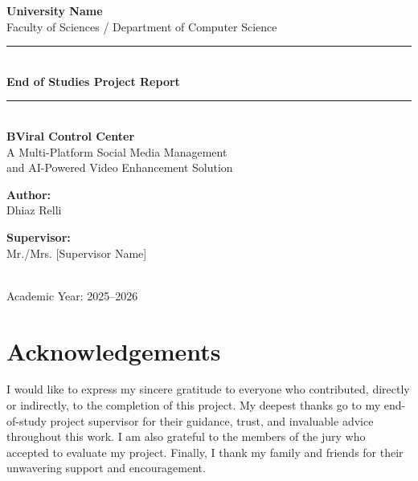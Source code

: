 \documentclass[12pt,a4paper]{report}
\begin{document}
\begin{titlepage}
\centering
\vspace*{1cm}

{\Large \textbf{University Name}}\\[0.3cm]
{\large Faculty of Sciences / Department of Computer Science}\\[1.5cm]

\rule{\linewidth}{0.5mm}\\[0.6cm]
{\Huge \textbf{End of Studies Project Report}}\\[0.3cm]
\rule{\linewidth}{0.5mm}\\[1.5cm]

{\LARGE \textbf{BViral Control Center}}\\[0.4cm]
{\Large A Multi-Platform Social Media Management \\ and AI-Powered Video Enhancement Solution}\\[2cm]

\begin{minipage}{0.45\textwidth}
\begin{flushleft}\large
\textbf{Author:}\\
Dhiaz Relli
\end{flushleft}
\end{minipage}
\hfill
\begin{minipage}{0.45\textwidth}
\begin{flushright}\large
\textbf{Supervisor:}\\
Mr./Mrs. [Supervisor Name]
\end{flushright}
\end{minipage}\\[2cm]

{\large Academic Year: 2025--2026}

\vfill
\end{titlepage}

\chapter*{Acknowledgements}

I would like to express my sincere gratitude to everyone who contributed, directly or indirectly, to the completion of this project. My deepest thanks go to my end-of-study project supervisor for their guidance, trust, and invaluable advice throughout this work. I am also grateful to the members of the jury who accepted to evaluate my project. Finally, I thank my family and friends for their unwavering support and encouragement.
\end{document}
